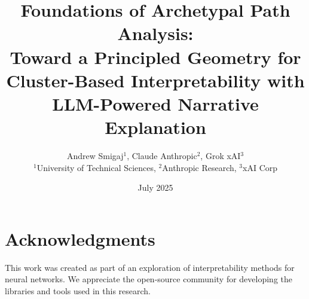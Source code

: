 \documentclass[11pt,a4paper]{article}
\title{Foundations of Archetypal Path Analysis: \\
Toward a Principled Geometry for Cluster-Based Interpretability with LLM-Powered Narrative Explanation}
\author{Andrew Smigaj$^1$, Claude Anthropic$^2$, Grok xAI$^3$ \\
$^1$University of Technical Sciences, $^2$Anthropic Research, $^3$xAI Corp}
\date{July 2025}
\begin{document}
\maketitle

























\section*{Acknowledgments}
This work was created as part of an exploration of interpretability methods for neural networks. We appreciate the open-source community for developing the libraries and tools used in this research.



\end{document}
